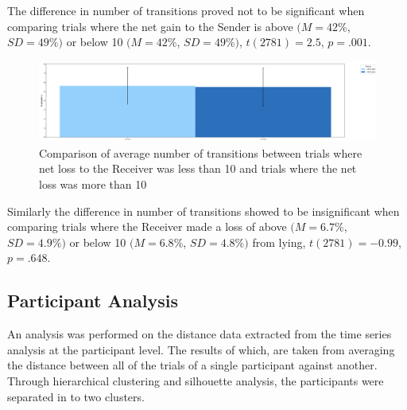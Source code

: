 \documentclass[man, floatsintext]{apa7}
\begin{document}
The difference in number of transitions proved not to be significant when comparing trials where the net gain to the Sender is above $(M = 42\%$, $SD = 49\%)$ or below 10 $(M = 42\%$, $SD = 49\%)$, $t(2781)=2.5$, $p=.001$.

\begin{figure}[H]
	\includegraphics[width=\linewidth]{../plots/RESPONSE/NTransitionPerLossPlot.png}
	\caption{Comparison of average number of transitions between trials where net loss to the Receiver was less than 10 and trials where the net loss was more than 10}
	\label{fig:NTransitionPerLoss}
\end{figure}

Similarly the difference in number of transitions showed to be insignificant when comparing trials where the Receiver made a loss of above $(M = 6.7\%$, $SD = 4.9\%)$  or below 10 $(M = 6.8\%$, $SD = 4.8\%)$ from lying, $t(2781)=-0.99$, $p=.648$.

\subsection{Participant Analysis}

An analysis was performed on the distance data extracted from the time series analysis at the participant level. The results of which, are taken from averaging the distance between all of the trials of a single participant against another. Through hierarchical clustering and silhouette analysis, the participants were separated in to two clusters.
\end{document}
